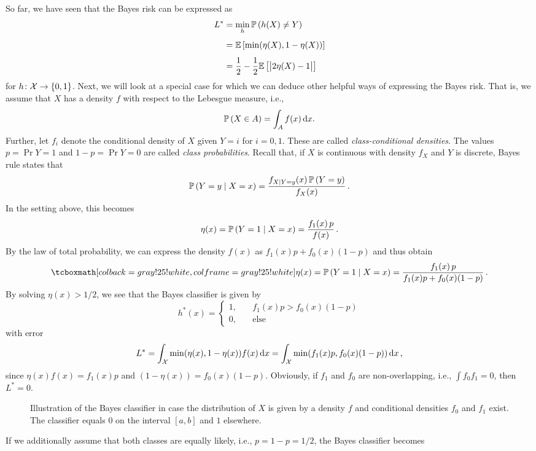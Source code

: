 So far, we have seen that the Bayes risk can be expressed as
\begin{align*}
    L^* &= \min_h \mathbb{P}\left(h(X) \neq Y\right) \\[4pt]
        &= \mathbb{E}\left[\min(\eta(X), 1-\eta(X))\right] \\[4pt]
        &= \frac{1}{2} - \frac{1}{2} \mathbb{E}\left[\big\lvert 2\eta(X) - 1 \big\rvert\right]
\end{align*}
for $h \colon \mathcal{X} \to \left\{0, 1\right\}$. Next, we will look at a special case for which we can deduce other helpful ways of expressing the Bayes risk. That is, we assume that $X$ has a density $f$ with respect to the Lebesgue measure, i.e.,
\[
    \mathbb{P}\left(X \in A\right) = \int_A f(x) \,\mathrm{d}x.
\]
Further, let $f_i$ denote the conditional density of $X$ given $Y = i$ for $i = 0, 1$. These are called \emph{class-conditional densities}. The values $p = \Pr{Y = 1}$ and $1 - p = \Pr{Y = 0}$ are called \emph{class probabilities}. Recall that, if $X$ is continuous with density $f_X$ and $Y$ is discrete, Bayes rule states that
\[
    \mathbb{P}\left(Y=y \mathrel{|} X=x\right) = \frac{f_{X \mathrel{|} Y=y}(x) \, \mathbb{P}\left(Y=y\right)}{f_X(x)} \, .
\]
In the setting above, this becomes
\[
    \eta(x) = \mathbb{P}\left(Y=1 \mathrel{|} X=x\right) = \frac{f_1(x) \, p}{f(x)} \, .
\]
By the law of total probability, we can express the density $f(x)$ as $f_1(x)p + f_0(x)(1-p)$ and thus obtain
\begin{equation}
    \highlightMath{
        \eta(x) = \Pr{Y=1 \given X=x} = \frac{f_1(x) \, p}{f_1(x)p + f_0(x)(1-p)} \, .
    }
\end{equation}
By solving $\eta(x) > 1/2$, we see that the Bayes classifier is given by
\[
    h^*(x) = \begin{cases}
        1, \quad & f_1(x)p > f_0(x)(1-p) \\
        0, \quad &\text{else}
    \end{cases}
\]
with error
\[
    L^* = \int_{\mathcal{X}} \min(\eta(x), 1-\eta(x)) f(x) \,\mathrm{d}x = \int_{\mathcal{X}} \min(f_1(x)p, f_0(x)(1-p)) \,\mathrm{d}x \, ,
\]
since $\eta(x)f(x) = f_1(x)p$ and $(1-\eta(x)) = f_0(x)(1-p)$. Obviously, if $f_1$ and $f_0$ are non-overlapping, i.e., $\int f_0 f_1 = 0$, then $L^* = 0$.
\begin{figure}
    \centering
    \resizebox{12cm}{!}{}
    \caption{%
        Illustration of the Bayes classifier in case the distribution of $X$ is given by a density $f$ and conditional densities $f_0$ and $f_1$ exist. The classifier equals $0$ on the interval $[a, b]$ and $1$ elsewhere.
    }
\end{figure}
If we additionally assume that both classes are equally likely, i.e., $p = 1-p = 1/2$, the Bayes classifier becomes
